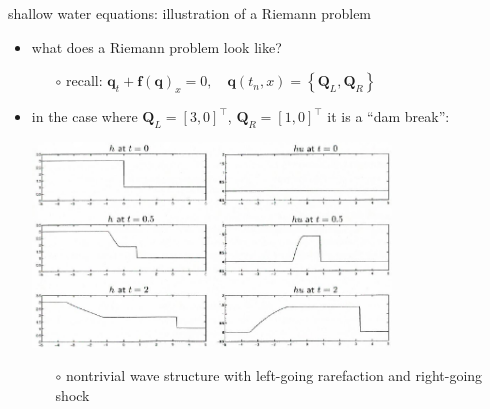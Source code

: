 \documentclass[10pt,dvipsnames,usepdftitle=false,
hyperref={pdftitle = {Finite volume methods},
    pdfauthor = {Ed Bueler}}]{beamer}
\newcommand{\bbf}{\mathbf{f}}
\newcommand{\bq}{\mathbf{q}}
\newcommand{\bQ}{\mathbf{Q}}
\begin{document}
\begin{frame}{shallow water equations: illustration of a Riemann problem}

\begin{itemize}
\item what does a Riemann problem look like?
    \begin{itemize}
    \item[$\circ$] recall: \quad $\bq_t + \bbf(\bq)_x = 0, \quad \bq(t_n,x) = \left\{\bQ_L, \bQ_R\right\}$
    \end{itemize}
\item in the case where $\bQ_L = [3,0]^\top$, $\bQ_R = [1,0]^\top$ it is a ``dam break'':

\begin{center}
\includegraphics[width=0.75\textwidth]{figs/leveque13p4}
\end{center}

    \begin{itemize}
    \item[$\circ$] nontrivial wave structure with left-going rarefaction and right-going shock
    \end{itemize}
\end{itemize}
\end{frame}
\end{document}
